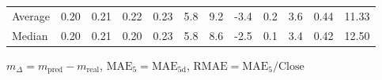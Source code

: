 \begin{threeparttable}
{\begin{tabular}{lrrrrrrrrrrr}
Average &          0.20 &          0.21 &          0.22 &        0.23 &                 5.8 &                 9.2 &       -3.4 &                 0.2 &              3.6 &            0.44 &                  11.33 \\
 Median &          0.20 &          0.21 &          0.20 &        0.23 &                 5.8 &                 8.6 &       -2.5 &                 0.1 &              3.4 &            0.42 &                  12.50 \\
\bottomrule
\end{tabular}
}
\begin{tablenotes}\footnotesize
\item $m_\Delta=m_{\text{pred}}-m_{\text{real}}$,
$\mathrm{MAE}_5=\mathrm{MAE}_{5\text{d}}$,
$\mathrm{RMAE}=\mathrm{MAE}_5/\text{Close}$
\end{tablenotes}
\end{threeparttable}
\endgroup

